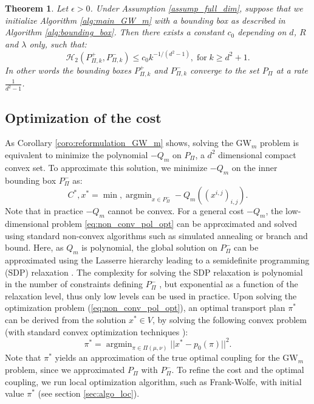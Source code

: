 \documentclass{article}
\newcommand{\1}{\mathbf{1}}
\newcommand{\GW}{\mathrm{GW}}
\DeclareMathOperator*{\argmin}{argmin}
\newtheorem{theorem}{Theorem}
\theoremstyle{definition}
\theoremstyle{remark}
\begin{document}
\begin{theorem}
    \label{theo:convergence_rate}
    Let $\epsilon>0$. Under Assumption \ref{assump_full_dim}, suppose that we initialize Algorithm \ref{alg:main_GW_m} with a bounding box as described in Algorithm \ref{alg:bounding_box}. Then there exists a constant $c_0$ depending on $d$, $R$ and $\lambda$ only, such that:
         \[\mathcal{H}_2(P_{\Pi,k}^+,P_{\Pi,k}^-)\leq c_0k^{-1/(d^2-1)},\;\mathrm{for}\; k\geq d^2+1.\]
    In other words the bounding boxes $P_{\Pi,k}^+$ and $P_{\Pi,k}^-$ converge to the set $P_\Pi$ at a rate $\frac{1}{d^2-1}$.
    

\end{theorem}



\subsection{Optimization of the cost}\label{sec:opti_cost}
As Corollary \ref{coro:reformulation_GW_m} shows, solving the $\GW_m$ problem is equivalent to  minimize the polynomial $-Q_m$ on $P_\Pi$, a $d^2$ dimensional compact convex set. To approximate this solution, we minimize $-Q_m$ on the inner bounding box $P_\Pi^-$ as:
\begin{equation} \label{eq:non_conv_pol_opt}
    C^*,x^*=\min,\argmin_{x\in P_{\Pi}^-}-Q_m((x^{i,j})_{i,j}).
\end{equation}
Note that in practice $-Q_m$ cannot be convex. For a general cost $-Q_m$, the low-dimensional problem \eqref{eq:non_conv_pol_opt} can be approximated and solved using standard non-convex algorithms such as simulated annealing or branch and bound. Here, as $Q_m$ is polynomial, the global solution on $P_\Pi^-$ can be approximated using the Lasserre hierarchy leading to a semidefinite programming (SDP) relaxation \cite{lasserre2001global}. The complexity for solving the SDP relaxation is polynomial in the number of constraints defining  $P_\Pi^-$ \cite{nesterov1994interior}, but exponential as a function of the relaxation level, thus only low levels can be used in practice. Upon solving the optimization problem (\ref{eq:non_conv_pol_opt}), an optimal transport plan $\pi^*$ can be derived from the solution $x^*\in V$, by solving the following convex problem (with standard convex optimization techniques \cite{boyd2004convex}):
\begin{equation}\label{eq:final_coupling}
    \pi^*=\argmin_{\pi\in \Pi(\mu,\nu)} ||x^*-p_0(\pi)||^2.
\end{equation}
Note that $\pi^*$ yields an approximation of the true optimal coupling for the $\GW_m$ problem, since we approximated $P_\Pi$ with $P_\Pi^-$. To refine the cost and the optimal coupling, we run local optimization algorithm, such as Frank-Wolfe, with initial value $\pi^*$ (see section \ref{sec:algo_loc}).
\end{document}
